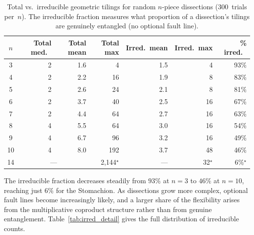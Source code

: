 \documentclass[12pt]{article}
\theoremstyle{definition}
\theoremstyle{remark}
\begin{document}
\begin{table}[ht]
\centering
\caption{Total vs.\ irreducible geometric tilings for random $n$-piece
  dissections (300~trials per~$n$). The irreducible fraction measures
  what proportion of a dissection's tilings are genuinely entangled
  (no optional fault line).}
\label{tab:irred_comparison}
\medskip
\begin{tabular}{@{}c r r r r r r@{}}
\toprule
$n$ & Total med.\ & Total mean & Total max & Irred.\ mean & Irred.\ max & \% irred.\ \\
\midrule
 3 &  2 & 1.6 &    4 & 1.5 &   4 & 93\% \\
 4 &  2 & 2.2 &   16 & 1.9 &   8 & 83\% \\
 5 &  2 & 2.6 &   24 & 2.1 &   8 & 81\% \\
 6 &  2 & 3.7 &   40 & 2.5 &  16 & 67\% \\
 7 &  2 & 4.4 &   64 & 2.7 &  16 & 63\% \\
 8 &  4 & 5.5 &   64 & 3.0 &  16 & 54\% \\
 9 &  4 & 6.7 &   96 & 3.2 &  16 & 49\% \\
10 &  4 & 8.0 &  192 & 3.7 &  48 & 46\% \\
\midrule
14 & \multicolumn{2}{c}{---} & 2{,}144${}^\star$ & --- & 32${}^\star$ & 6\%${}^\star$ \\
\bottomrule
\end{tabular}
\end{table}

The irreducible fraction decreases steadily from $93\%$ at $n = 3$ to
$46\%$ at $n = 10$, reaching just $6\%$ for the Stomachion.
As dissections grow more complex, optional fault lines become
increasingly likely, and a larger share of the flexibility arises from
the multiplicative coproduct structure rather than from genuine
entanglement. Table~\ref{tab:irred_detail} gives the full distribution
of irreducible counts.
\end{document}
